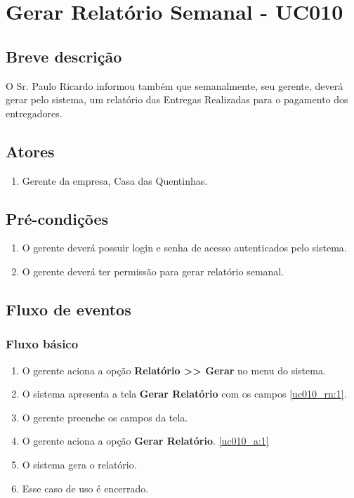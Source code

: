 \chapter{Gerar Relatório Semanal - UC010} \label{uc010}

\section{Breve descrição}

O Sr. Paulo Ricardo informou também que semanalmente, seu gerente, deverá gerar pelo sistema, um relatório das Entregas Realizadas para o pagamento dos entregadores.

\section{Atores}

\begin{enumerate}
	\item Gerente da empresa, Casa das Quentinhas.
\end{enumerate}

\section{Pré-condições}

\begin{enumerate}
	\item O gerente deverá possuir login e senha de acesso autenticados pelo sistema.
	\item O gerente deverá ter permissão para gerar relatório semanal.
\end{enumerate}

\section{Fluxo de eventos}

\subsection{Fluxo básico}

\begin{enumerate}[label=P\arabic*]
	\item O gerente aciona a opção \textbf{Relatório >> Gerar} no menu do sistema. \label{uc010_p:1}
	\item O sistema apresenta a tela \textbf{Gerar Relatório} com os campos \ref{uc010_rn:1}.	
	\item O gerente preenche os campos da tela. \label{uc010_p:3}	
	\item O gerente aciona a opção \textbf{Gerar Relatório}. \label{uc010_p:4}\ref{uc010_a:1}	
	\item O sistema gera o relatório.
	\item Esse caso de uso é encerrado.	
\end{enumerate}

